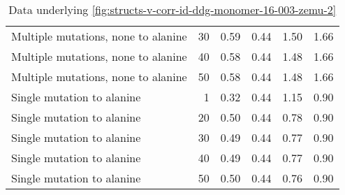 \begin{table}
\begin{tabular}{lrrrrr}
 Multiple mutations, none to alanine &            30 &             0.59 &                    0.44 &               1.50 &                      1.66 \\
 Multiple mutations, none to alanine &            40 &             0.58 &                    0.44 &               1.48 &                      1.66 \\
 Multiple mutations, none to alanine &            50 &             0.58 &                    0.44 &               1.48 &                      1.66 \\
          Single mutation to alanine &             1 &             0.32 &                    0.44 &               1.15 &                      0.90 \\
          Single mutation to alanine &            20 &             0.50 &                    0.44 &               0.78 &                      0.90 \\
          Single mutation to alanine &            30 &             0.49 &                    0.44 &               0.77 &                      0.90 \\
          Single mutation to alanine &            40 &             0.49 &                    0.44 &               0.77 &                      0.90 \\
          Single mutation to alanine &            50 &             0.50 &                    0.44 &               0.76 &                      0.90 \\
\bottomrule
\end{tabular}

\caption[]{Data underlying \cref{fig:structs-v-corr-id-ddg-monomer-16-003-zemu-2}}
\label{tab:structs-v-corr-id-ddg-monomer-16-003-zemu-2-underlying-data}
\end{table}
